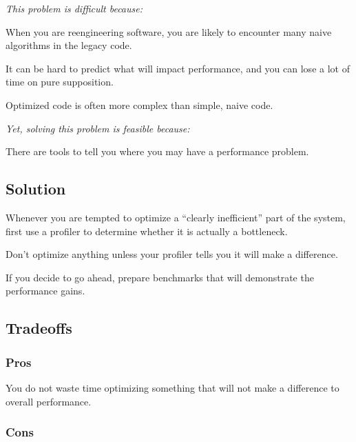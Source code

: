 \documentclass[a4paper,10pt,twoside]{book}
\begin{document}
\emph{This problem is difficult because:} 

\begin{bulletlist}
\item When you are reengineering software, you are likely to encounter many naive algorithms in the legacy code.

\item It can be hard to predict what will impact performance, and you can lose a lot of time on pure supposition.

\item Optimized code is often more complex than simple, naive code.
\end{bulletlist}

\emph{Yet, solving this problem is feasible because:}

\begin{bulletlist}
\item There are tools to tell you where you may have a performance problem.
\end{bulletlist}

\subsection*{Solution}

Whenever you are tempted to optimize a ``clearly inefficient'' part of the system, first use a profiler to determine whether it is actually a bottleneck. 

Don't optimize anything unless your profiler tells you it will make a difference.

If you decide to go ahead, prepare benchmarks that will demonstrate the performance gains. 

\subsection*{Tradeoffs}

\subsubsection*{Pros}

\begin{bulletlist}
\item You do not waste time optimizing something that will not make a difference to overall performance.
\end{bulletlist}

\subsubsection*{Cons}
\end{document}
